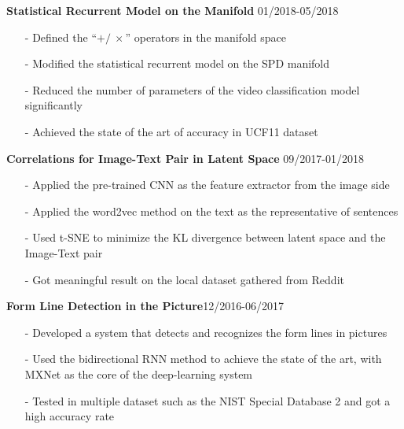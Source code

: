 \documentclass[margin]{res}
\begin{document}
\begin{resume}
                 \textbf{Statistical Recurrent Model on the Manifold} \hfill 01/2018-05/2018
                \begin{itemize}\itemsep -2.2pt %
                 \item[-] Defined the ``$+/\ \times$'' operators in the manifold space
                 \item[-] Modified the statistical recurrent model on the SPD manifold
                 \item[-] Reduced the number of parameters of the video classification model significantly
                 \item[-] Achieved the state of the art of accuracy in UCF11 dataset
                 \end{itemize}

                 \textbf{Correlations for Image-Text Pair in Latent Space} \hfill 09/2017-01/2018
                \begin{itemize}\itemsep -2.2pt %
                 \item[-] Applied the pre-trained CNN as the feature extractor from the image side 
                 \item[-] Applied the word2vec method on the text as the representative of sentences
                 \item[-] Used t-SNE to minimize the KL divergence between latent space and the Image-Text pair
                 \item[-] Got meaningful result on the local dataset gathered from Reddit
                 \end{itemize}

                 \textbf{Form Line Detection in the Picture}\hfill 12/2016-06/2017
                \begin{itemize}\itemsep -2.2pt %
                 \item[-] Developed a system that detects and recognizes the form lines in pictures
                 \item[-] Used the bidirectional RNN method to achieve the state of the art, with MXNet as the core of the deep-learning system 
                 \item[-] Tested in multiple dataset such as the NIST Special Database 2 and got a high accuracy rate
                 \end{itemize}



\end{resume}
\end{document}

